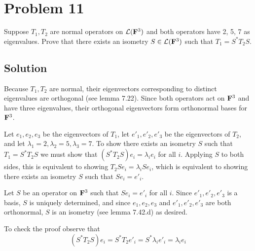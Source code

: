 \documentclass{article}
\begin{document}
\section*{Problem 11}
Suppose $T_1, T_2$ are normal operators on $\mathcal{L}(\mathbf{F}^3)$ and both operators have 2, 5, 7 as eigenvalues. Prove that there exists an isometry $S\in\mathcal{L}(\mathbf{F}^3)$ such that $T_1=S^*T_2S$.

\subsection*{Solution}
Because $T_1,T_2$ are normal, their eigenvectors corresponding to distinct eigenvalues are orthogonal (see lemma 7.22). Since both operators act on $\mathbf{F}^3$ and have three eigenvalues, their orthogonal eigenvectors form orthonormal bases for $\mathbf{F}^3$.

\vs

Let $e_1, e_2, e_3$ be the eigenvectors of $T_1$, let $e'_1, e'_2, e'_3$ be the eigenvectors of $T_2$, and let $\lambda_1=2, \lambda_2=5, \lambda_3=7$. To show there exists an isometry $S$ such that $T_1=S^*T_2S$ we must show that $(S^*T_2S)e_i=\lambda_i e_i$ for all $i$. Applying $S$ to both sides, this is equivalent to showing $T_2Se_i=\lambda_i S e_i$, which is equivalent to showing there exists an isometry $S$ such that $Se_i=e'_i$.

\vs

Let $S$ be an operator on $\mathbf{F}^3$ such that $Se_i=e'_i$ for all $i$. Since $e'_1, e'_2, e'_3$ is a basis, $S$ is uniquely determined, and since $e_1, e_2, e_3$ and $e'_1, e'_2, e'_3$ are both orthonormal, $S$ is an isometry (see lemma 7.42.d) as desired.

\vs

To check the proof observe that
\[(S^*T_2S)e_i=S^*T_2e'_i=S^*\lambda_i e'_i=\lambda_i e_i\]
\end{document}
